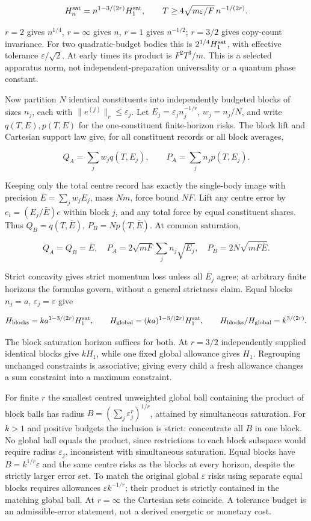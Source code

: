 \documentclass[11pt,a4paper]{article}
\begin{document}
\[H_n^{\rm sat}=n^{1-3/(2r)}H_1^{\rm sat},\qquad
T\ge4\sqrt{m\varepsilon/F}\,n^{-1/(2r)}.\]

\(r=2\) gives \(n^{1/4}\), \(r=\infty\) gives \(n\), \(r=1\) gives
\(n^{-1/2}\); \(r=3/2\) gives copy-count invariance. For two
quadratic-budget bodies this is \(2^{1/4}H_1^{\rm sat}\), with effective
tolerance \(\varepsilon/\sqrt2\). At early times its product is
\(F^2T^3/m\). This is a selected apparatus norm, not
independent-preparation universality or a quantum phase constant.

Now partition \(N\) identical constituents into independently budgeted
blocks of sizes \(n_j\), each with \(\|e^{(j)}\|_r\le\varepsilon_j\).
Let \(E_j=\varepsilon_jn_j^{-1/r}\), \(w_j=n_j/N\), and write
\(q(T,E),p(T,E)\) for the one-constituent finite-horizon risks. The
block lift and Cartesian support law give, for all constituent records
or all block averages,

\[Q_A=\sum_jw_jq(T,E_j),\qquad P_A=\sum_jn_jp(T,E_j).\]

Keeping only the total centre record has exactly the single-body image
with precision \(\bar E=\sum_jw_jE_j\), mass \(Nm\), force bound \(NF\).
Lift any centre error by \(e_i=(E_j/\bar E)e\) within block \(j\), and
any total force by equal constituent shares. Thus \(Q_B=q(T,\bar E)\),
\(P_B=Np(T,\bar E)\). At common saturation,

\[Q_A=Q_B=\bar E,\quad
P_A=2\sqrt{mF}\sum_jn_j\sqrt{E_j},\quad
P_B=2N\sqrt{mF\bar E}.\]

Strict concavity gives strict momentum loss unless all \(E_j\) agree; at
arbitrary finite horizons the formulas govern, without a general
strictness claim. Equal blocks \(n_j=a\), \(\varepsilon_j=\varepsilon\)
give

\[H_{\rm blocks}=k a^{1-3/(2r)}H_1^{\rm sat},\qquad
H_{\rm global}=(ka)^{1-3/(2r)}H_1^{\rm sat},\qquad
H_{\rm blocks}/H_{\rm global}=k^{3/(2r)}.\]

The block saturation horizon suffices for both. At \(r=3/2\)
independently supplied identical blocks give \(kH_1\), while one fixed
global allowance gives \(H_1\). Regrouping unchanged constraints is
associative; giving every child a fresh allowance changes a sum
constraint into a maximum constraint.

For finite \(r\) the smallest centred unweighted global ball containing
the product of block balls has radius
\(B=(\sum_j\varepsilon_j^r)^{1/r}\), attained by simultaneous
saturation. For \(k>1\) and positive budgets the inclusion is strict:
concentrate all \(B\) in one block. No global ball equals the product,
since restrictions to each block subspace would require radius
\(\varepsilon_j\), inconsistent with simultaneous saturation. Equal
blocks have \(B=k^{1/r}\varepsilon\) and the same centre risks as the
blocks at every horizon, despite the strictly larger error set. To match
the original global \(\varepsilon\) risks using separate equal blocks
requires allowances \(\varepsilon k^{-1/r}\); their product is strictly
contained in the matching global ball. At \(r=\infty\) the Cartesian
sets coincide. A tolerance budget is an admissible-error statement, not
a derived energetic or monetary cost.
\end{document}
